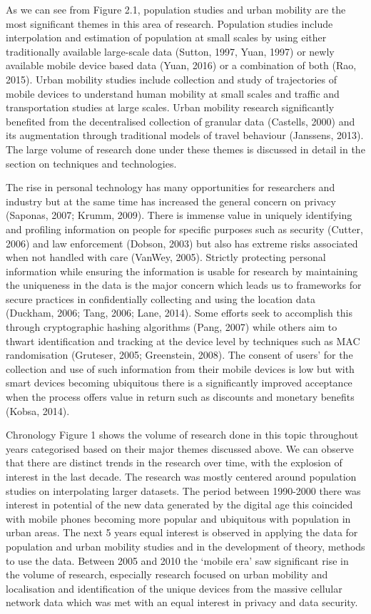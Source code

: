 As we can see from Figure 2.1, population studies and urban mobility are the most significant themes in this area of research. Population studies include interpolation and estimation of population at small scales by using either traditionally available large-scale data (Sutton, 1997, Yuan, 1997) or newly available mobile device based data (Yuan, 2016) or a combination of both (Rao, 2015). Urban mobility studies include collection and study of trajectories of mobile devices to understand human mobility at small scales and traffic and transportation studies at large scales. Urban mobility research significantly benefited from the decentralised collection of granular data (Castells, 2000) and its augmentation through traditional models of travel behaviour (Janssens, 2013). The large volume of research done under these themes is discussed in detail in the section on techniques and technologies.

The rise in personal technology has many opportunities for researchers and industry but at the same time has increased the general concern on privacy (Saponas, 2007; Krumm, 2009). There is immense value in uniquely identifying and profiling information on people for specific purposes such as security (Cutter, 2006) and law enforcement (Dobson, 2003) but also has extreme risks associated when not handled with care (VanWey, 2005). Strictly protecting personal information while ensuring the information is usable for research by maintaining the uniqueness in the data is the major concern which leads us to frameworks for secure practices in confidentially collecting and using the location data (Duckham, 2006; Tang, 2006; Lane, 2014). Some efforts seek to accomplish this through cryptographic hashing algorithms (Pang, 2007) while others aim to thwart identification and tracking at the device level by techniques such as MAC randomisation (Gruteser, 2005; Greenstein, 2008). The consent of users’ for the collection and use of such information from their mobile devices is low but with smart devices becoming ubiquitous there is a significantly improved acceptance when the process offers value in return such as discounts and monetary benefits (Kobsa, 2014). 

Chronology
Figure 1 shows the volume of research done in this topic throughout years categorised based on their major themes discussed above. We can observe that there are distinct trends in the research over time, with the explosion of interest in the last decade. The research was mostly centered around population studies on interpolating larger datasets. The period between 1990-2000 there was interest in potential of the new data generated by the digital age this coincided with mobile phones becoming more popular and ubiquitous with population in urban areas. The next 5 years equal interest is observed in applying the data for population and urban mobility studies and in the development of theory, methods to use the data. Between 2005 and 2010 the ‘mobile era’ saw significant rise in the volume of research, especially research focused on urban mobility and localisation and identification of the unique devices from the massive cellular network data which was met with an equal interest in privacy and data security.

